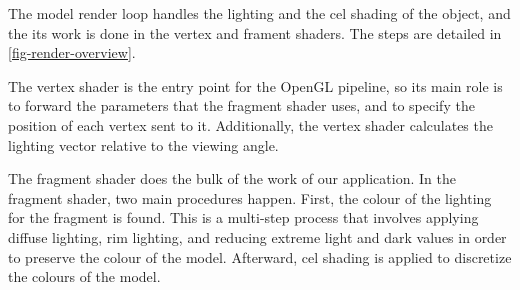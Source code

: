 The model render loop handles the lighting and the cel shading of the object, and the its work is
done in the vertex and frament shaders. The steps are detailed in \autoref{fig-render-overview}.

The vertex shader is the entry point for the OpenGL pipeline, so its main role is to forward the 
parameters that the fragment shader uses, and to specify the position of each vertex sent to it. 
Additionally, the vertex shader calculates the lighting vector relative to the viewing angle.

The fragment shader does the bulk of the work of our application. In the fragment shader, two main
procedures happen. First, the colour of the lighting for the fragment is found. This is a multi-step
process that involves applying diffuse lighting, rim lighting, and reducing extreme light and dark 
values in order to preserve the colour of the model. Afterward, cel shading is applied to discretize
the colours of the model. 

